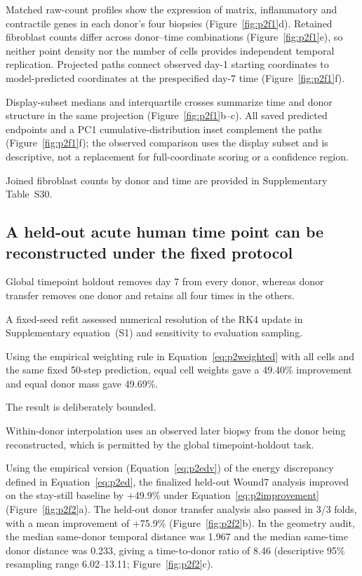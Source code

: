 \documentclass[10pt,a4paper]{article}
\begin{document}
Matched raw-count profiles show the expression of matrix, inflammatory and contractile genes in each donor's four biopsies (Figure~\ref{fig:p2f1}d). Retained fibroblast counts differ across donor--time combinations (Figure~\ref{fig:p2f1}e), so neither point density nor the number of cells provides independent temporal replication. Projected paths connect observed day-1 starting coordinates to model-predicted coordinates at the prespecified day-7 time (Figure~\ref{fig:p2f1}f).

Display-subset medians and interquartile crosses summarize time and donor structure in the same projection (Figure~\ref{fig:p2f1}b--c). All saved predicted endpoints and a PC1 cumulative-distribution inset complement the paths (Figure~\ref{fig:p2f1}f); the observed comparison uses the display subset and is descriptive, not a replacement for full-coordinate scoring or a confidence region.

Joined fibroblast counts by donor and time are provided in Supplementary Table~S30.

\subsection{A held-out acute human time point can be reconstructed under the fixed protocol}

Global timepoint holdout removes day 7 from every donor, whereas donor transfer removes one donor and retains all four times in the others.

A fixed-seed refit assessed numerical resolution of the RK4 update in Supplementary equation~(S1) and sensitivity to evaluation sampling.

Using the empirical weighting rule in Equation~\eqref{eq:p2weighted} with all cells and the same fixed 50-step prediction, equal cell weights gave a 49.40\% improvement and equal donor mass gave 49.69\%.

The result is deliberately bounded.

Within-donor interpolation uses an observed later biopsy from the donor being reconstructed, which is permitted by the global timepoint-holdout task.

\FloatBarrier
Using the empirical version (Equation~\eqref{eq:p2edv}) of the energy discrepancy defined in Equation~\eqref{eq:p2ed}, the finalized held-out Wound7 analysis improved on the stay-still baseline by +49.9\% under Equation~\eqref{eq:p2improvement} (Figure~\ref{fig:p2f2}a\label{call:p2f2}). The held-out donor transfer analysis also passed in 3/3 folds, with a mean improvement of +75.9\% (Figure~\ref{fig:p2f2}b). In the geometry audit, the median same-donor temporal distance was 1.967 and the median same-time donor distance was 0.233, giving a time-to-donor ratio of 8.46 (descriptive 95\% resampling range 6.02--13.11; Figure~\ref{fig:p2f2}c).
\end{document}

